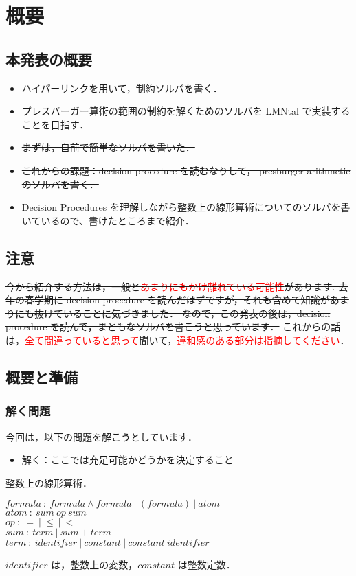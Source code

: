 \chapter{概要}
\section{本発表の概要}
\begin{itemize}
    \item ハイパーリンクを用いて，制約ソルバを書く．
    \item プレスバーガー算術の範囲の制約を解くためのソルバを LMNtal で実装することを目指す．
    \item \sout{まずは，自前で簡単なソルバを書いた．}
    \item \sout{これからの課題：decision procedure を読むなりして， presburger arithmetic のソルバを書く．}
    \item Decision Procedures を理解しながら整数上の線形算術についてのソルバを書いているので、書けたところまで紹介．
\end{itemize}

\section{注意}
\sout{
今から紹介する方法は，一般と\textcolor{red}{あまりにもかけ離れている可能性}があります.
去年の春学期に decision procedure を読んだはずですが，それも含めて知識があまりにも抜けていることに気づきました．
なので，この発表の後は，decision procedure を読んで，まともなソルバを書こうと思っています．
}
これからの話は，\textcolor{red}{全て間違っていると思って}聞いて，\textcolor{red}{違和感のある部分は指摘してください}．

\section{概要と準備}
\subsection*{解く問題}
今回は，以下の問題を解こうとしています．\\
\begin{itemize}
    \item 解く：ここでは充足可能かどうかを決定すること
\end{itemize}

整数上の線形算術．
\begin{center}
    $formula\: :\: formula\wedge formula \:|\: (formula) \:|\: atom$\\
    $atom \::\: sum \: op \: sum$\\
    $op \::\: = \:|\: \leq \:|\: <$\\
    $sum \::\: term \:|\: sum+term$\\
    $term \::\: identifier \:|\: constant \:|\: constant \: identifier$
\end{center}
$identifier$ は，整数上の変数，$constant$ は整数定数．

